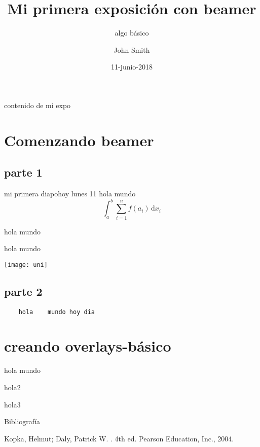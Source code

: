 \documentclass[utf8,spanish, xcolor={x11names,table},14pt, handout]{beamer}
\title{Mi primera exposición con beamer}
\subtitle{algo básico}
\author{John Smith}
\institute[UNI]{Universidad Nacional de Ingeniería}
\date{11-junio-2018}
\begin{document}
\maketitle

\begin{frame}{contenido de mi expo}\transboxin
  \tableofcontents
\end{frame}

\section{Comenzando beamer}
\subsection{parte 1}
\begin{frame}{mi primera diapo}{hoy lunes 11}\transglitter
  hola mundo
  $$
  \int_a^b\sum_{i=1}^n f(a_i)\,\mathrm{d}x_i
  $$
\end{frame}

\begin{frame}[t]
  hola mundo
\end{frame}

\begin{frame}[b]
  hola mundo
\end{frame}

\begin{frame}[plain]
  \hspace*{-1cm}\texttt{[image: uni]}
\end{frame}

\subsection{parte 2}
\begin{frame}[fragile]
  \begin{verbatim}
    hola    mundo hoy dia
  \end{verbatim}
\end{frame}


\section{creando overlays-básico}
\begin{frame}
  hola mundo \pause
  
  hola2 \pause
  
  hola3
\end{frame}

\begin{frame}{Bibliografía}\transblindsvertical
\begin{thebibliography}{9}
Kopka, Helmut; Daly, Patrick W.
. 4th ed.
\newblock Pearson Education, Inc., 2004.
\end{thebibliography}
\end{frame}
\end{document}
